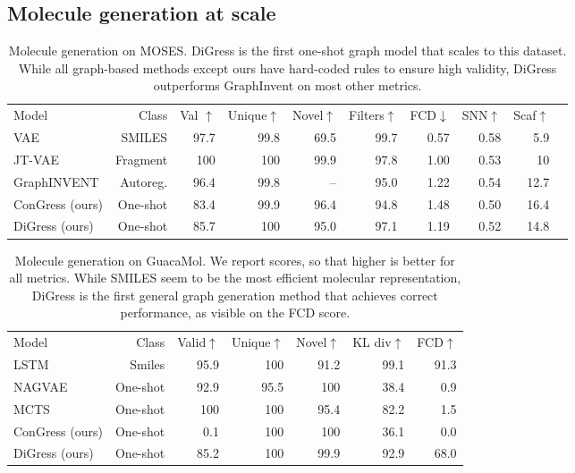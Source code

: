 \documentclass{article} %
\theoremstyle{plain}
\theoremstyle{definition}
\theoremstyle{remark}
\begin{document}
\subsection{Molecule generation at scale}
\begin{table}[t]
    \centering
    \caption{Molecule generation on MOSES. DiGress is the first one-shot graph model that scales to this dataset. While all graph-based methods except ours have hard-coded rules to ensure high validity, DiGress outperforms GraphInvent on most other metrics.}
        \label{tab:moses}
    \begin{tabular}{l r r r r r r r r r} \toprule
    Model & Class &  Val $\uparrow$ & Unique$\uparrow$ & Novel$\uparrow$ & Filters$\uparrow$ & FCD$\downarrow$ & SNN$\uparrow$ & Scaf$\uparrow$ \vspace{0.2cm}\\
    VAE & SMILES & 97.7 & 99.8 & 69.5 & 99.7 & 0.57 & 0.58 & 5.9 \\
    JT-VAE & Fragment & 100 & 100 & 99.9 & 97.8 & 1.00 & 0.53 & 10 \\
    GraphINVENT & Autoreg. & 96.4 & 99.8 & -- & 95.0 & 1.22 & 0.54 & 12.7 \\
    ConGress (ours) & One-shot & 83.4 & 99.9 & 96.4 & 94.8 & 1.48 & 0.50 & 16.4\\
    DiGress (ours) & One-shot & 85.7 & 100 & 95.0 & 97.1 & 1.19 & 0.52 & 14.8 \\
    \bottomrule
    \end{tabular}
\end{table}

\begin{table}[t]
    \centering
    \vspace{-0.2cm}
        \caption{Molecule generation on GuacaMol. We report scores, so that higher is better for all metrics. While SMILES seem to be the most efficient molecular representation, DiGress is the first general graph generation method that achieves correct performance, as visible on the FCD score. }
    \begin{tabular}{l r r r r r r} \toprule
    Model & Class &  Valid$\uparrow$ & Unique$\uparrow$ & Novel$\uparrow$  & KL div$\uparrow$ & FCD$\uparrow$ \vspace{0.2cm}\\
    LSTM & Smiles &  95.9 & 100 & 91.2 & 99.1 & 91.3 \\
    NAGVAE & One-shot & 92.9 & 95.5 & 100 & 38.4 & 0.9\\
    MCTS & One-shot & 100 & 100 & 95.4 & 82.2 & 1.5 \\
    ConGress (ours) & One-shot &  0.1 & 100 & 100 & 36.1 & 0.0  \\
    DiGress (ours) & One-shot & 85.2 & 100 & 99.9 & 92.9 & 68.0 \\ 
    \bottomrule
    \end{tabular}
    \label{tab:guacamol}
\end{table}
\end{document}
